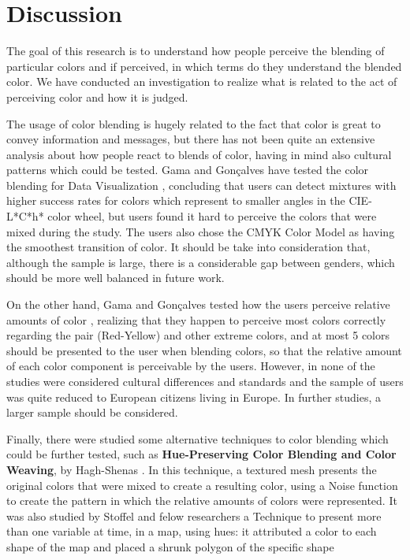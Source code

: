 \section{Discussion}
\label{sec:background_discussion}
%
The goal of this research is to understand how people perceive the blending of particular colors and if perceived,
in which terms do they understand the blended color. We have conducted an investigation to realize what is related to
the act of perceiving color and how it is judged.  \par
The usage of color blending is hugely related to the fact that color is great to convey information and messages,
but there has not been quite an extensive analysis about how people react to blends of color, having in mind also
cultural patterns which could be tested. Gama and Gonçalves have tested the color blending for Data Visualization \cite{Gama20141},
concluding that users can detect mixtures with higher success rates for colors which represent to smaller angles
in the CIE-L*C*h* color wheel, but users found it hard to perceive the colors that were mixed during the study.
The users also chose the CMYK Color Model as having the smoothest transition of color. It should be take into
consideration that, although the sample is large, there is a considerable gap between genders, which should be
more well balanced in future work. \par
On the other hand, Gama and Gonçalves tested how the users perceive relative amounts of color \cite{Gama20142}, realizing that they happen to perceive most
colors correctly regarding the pair (Red-Yellow) and other extreme colors, and at most 5 colors should be presented
to the user when blending colors, so that the relative amount of each color component is perceivable by the users.
However, in none of the studies were considered cultural differences and standards and the sample of users was
quite reduced to European citizens living in Europe. In further studies, a larger sample should be
considered. \par
Finally, there were studied some alternative techniques to color blending which could be further tested, such
as \textbf{Hue-Preserving Color Blending and Color Weaving}, by Hagh-Shenas \cite{Hagh-Shenas2007}. In this technique, a textured mesh presents the original
colors that were mixed to create a resulting color, using a Noise function to create the pattern in which the
relative amounts of colors were represented. It was also studied by Stoffel and felow researchers \cite{Stoffel2012} a Technique
to present more than one variable at time, in a map, using hues: it attributed a color to each shape of the map and placed a shrunk polygon of the specific shape
